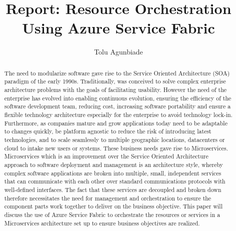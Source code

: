 
\title{Report: Resource Orchestration Using Azure Service Fabric }


\author{Tolu Agunbiade}


\renewcommand{\shortauthors}{T. Agunbiade}


\begin{abstract}
The need to modularize software gave rise to the Service Oriented
Architecture (SOA) paradigm of the early 1990s. Traditionally, was
conceived to solve complex enterprise architecture problems with the
goals of facilitating usability. However the need of the enterprise
has evolved into enabling continuous evolution, ensuring the
efficiency of the software development team, reducing cost, increasing
software portability and ensure a flexible technology architecture
especially for the enterprise to avoid technology
lock-in. Furthermore, as companies mature and grow applications today
need to be adaptable to changes quickly, be platform agnostic to
reduce the risk of introducing latest technologies, and to scale
seamlessly to multiple geographic locations, datacenters or cloud to
intake new users or systems. These business needs gave rise to
Microservices. Microservices which is an improvement over the Service
Oriented Architecture approach to software deployment and management
is an architecture style, whereby complex software applications are
broken into multiple, small, independent services that can communicate
with each other over standard communications protocols with
well-defined interfaces. The fact that these services are decoupled
and broken down therefore necessitates the need for management and
orchestration to ensure the component parts work together to deliver
on the business objective. This paper will discuss the use of Azure
Service Fabric to orchestrate the resources or services in a
Microservices architecture set up to ensure business objectives are
realized.

\end{abstract}



\maketitle


